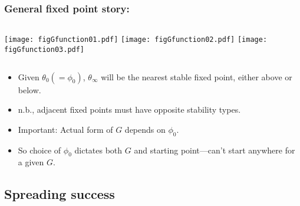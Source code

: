 \begin{frame}
  \frametitle{General fixed point story:}

  \begin{block}{}
    \begin{columns}
      \texttt{[image: figGfunction01.pdf]}
      \texttt{[image: figGfunction02.pdf]}
      \texttt{[image: figGfunction03.pdf]}
    \end{columns}

    \begin{itemize}
    \item<1-> 
      Given $\theta_0 (= \phi_0)$, $\theta_\infty$ will be 
      the nearest stable fixed point, either above or below.
    \item<2-> 
      n.b., adjacent fixed points must have opposite stability types.
    \item<3-> 
      \alert{Important:}
      Actual form of $G$ depends on $\phi_0$.  
    \item<4->
      So choice of $\phi_0$ dictates both $G$ and starting
      point---can't start anywhere for a given $G$.
    \end{itemize}
  \end{block}

\end{frame}

\subsection{Spreading success}




